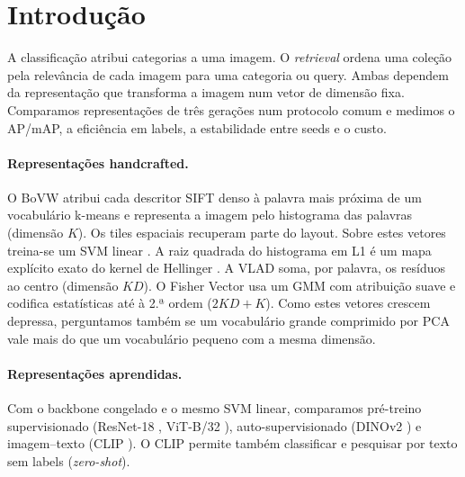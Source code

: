 \section{Introdução}
\label{sec:intro}

A classificação atribui categorias a uma imagem. O \emph{retrieval} ordena uma coleção pela relevância de cada imagem para uma categoria ou query. Ambas dependem da representação que transforma a imagem num vetor de dimensão fixa. Comparamos representações de três gerações num protocolo comum e medimos o AP/mAP, a eficiência em labels, a estabilidade entre seeds e o custo.

\paragraph{Representações handcrafted.}
O BoVW \cite{sivic2003,csurka2004} atribui cada descritor SIFT denso \cite{lowe2004} à palavra mais próxima de um vocabulário k-means e representa a imagem pelo histograma das palavras (dimensão $K$). Os tiles espaciais \cite{lazebnik2006} recuperam parte do layout. Sobre estes vetores treina-se
um SVM linear \cite{cortes1995}. A raiz quadrada do histograma em L1 é um mapa explícito exato do kernel de Hellinger \cite{vedaldi2012}. A VLAD \cite{jegou2010} soma, por palavra, os resíduos ao centro (dimensão $KD$). O Fisher Vector \cite{perronnin2010} usa um GMM com atribuição suave e codifica
estatísticas até à 2.ª ordem ($2KD{+}K$). Como estes vetores crescem depressa, perguntamos também se um vocabulário grande comprimido por PCA vale mais do que um vocabulário pequeno com a mesma dimensão.

\paragraph{Representações aprendidas.}
Com o backbone congelado e o mesmo SVM linear, comparamos pré-treino supervisionado (ResNet-18 \cite{he2016resnet}, ViT-B/32
\cite{dosovitskiy2021vit}), auto-supervisionado (DINOv2 \cite{oquab2024dinov2}) e imagem--texto (CLIP \cite{radford2021clip}). O CLIP permite também classificar e pesquisar por texto sem labels (\emph{zero-shot}).

